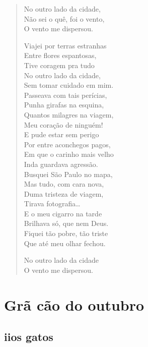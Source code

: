 
\begin{verse}
No outro lado da cidade,\\
Não sei o quê, foi o vento,\\
O vento me dispersou.

Viajei por terras estranhas\\
Entre flores espantosas,\\
Tive coragem pra tudo\\
No outro lado da cidade,\\
Sem tomar cuidado em mim.\\
Passeava com tais perícias,\\
Punha girafas na esquina,\\
Quantos milagres na viagem,\\
Meu coração de ninguém!\\
E pude estar sem perigo\\
Por entre aconchegos pagos,\\
Em que o carinho mais velho\\
Inda guardava agressão.\\
Busquei São Paulo no mapa,\\
Mas tudo, com cara nova,\\
Duma tristeza de viagem,\\
Tirava fotografia\ldots{}\\
E o meu cigarro na tarde\\
Brilhava só, que nem Deus.\\
Fiquei tão pobre, tão triste\\
Que até meu olhar fechou.

No outro lado da cidade\\
O vento me dispersou.
\end{verse}

\chapter{Grã cão do outubro}


\section*{ii\break os gatos}


